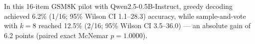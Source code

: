 In this 16-item GSM8K pilot with Qwen2.5-0.5B-Instruct, greedy decoding achieved 6.2\% (1/16; 95\% Wilson CI 1.1--28.3) accuracy, while sample-and-vote with $k=8$ reached 12.5\% (2/16; 95\% Wilson CI 3.5--36.0) --- an absolute gain of 6.2 points (paired exact McNemar $p=1.0000$).
